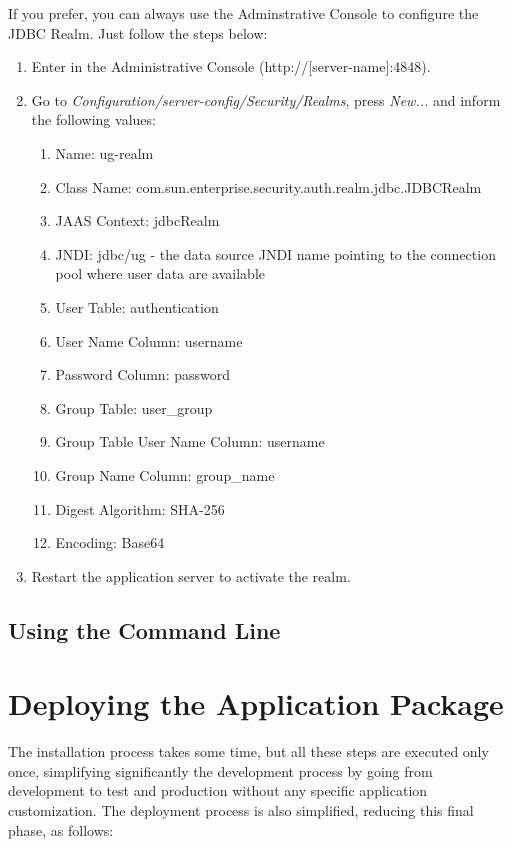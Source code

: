 \documentclass[envcountsame,envcountchap]{svmono}
\begin{document}
If you prefer, you can always use the Adminstrative Console to configure the JDBC Realm. Just follow the steps below:

\begin{enumerate}
\item Enter in the Administrative Console (http://[server-name]:4848).
\item Go to \textit{Configuration/server-config/Security/Realms}, press \textit{New...} and inform the following values:
   \begin{enumerate}
   \item Name: ug-realm
   \item Class Name: com.sun.enterprise.security.auth.realm.jdbc.JDBCRealm
   \item JAAS Context: jdbcRealm
   \item JNDI: jdbc/ug - the data source JNDI name pointing to the connection pool where user data are available
   \item User Table: authentication
   \item User Name Column: username
   \item Password Column: password
   \item Group Table: user\_group
   \item Group Table User Name Column: username
   \item Group Name Column: group\_name
   \item Digest Algorithm: SHA-256
   \item Encoding: Base64
   \end{enumerate}
\item Restart the application server to activate the realm.
\end{enumerate}

\subsection{Using the Command Line}

\section{Deploying the Application Package}

The installation process takes some time, but all these steps are executed only once, simplifying significantly the development process by going from development to test and production without any specific application customization. The deployment process is also simplified, reducing this final phase, as follows:
\end{document}
